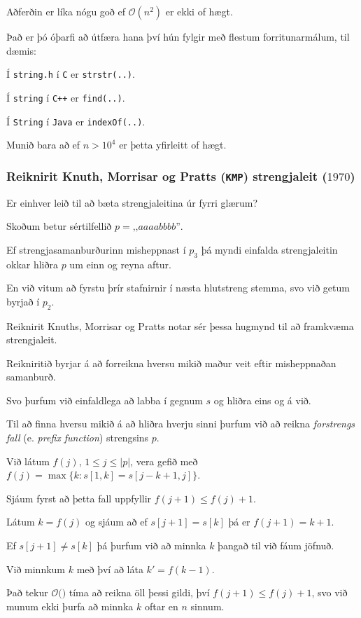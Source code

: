 {
	{
		\item<1-> Aðferðin er líka nógu goð ef $\mathcal{O}(n^2)$ er ekki of hægt.
		\item<2-> Það er þó óþarfi að útfæra hana því hún fylgir með flestum forritunarmálum, til dæmis:
		{
			\item<3-> Í \texttt{string.h} í \texttt{C} er \texttt{strstr(..)}.
			\item<4-> Í \texttt{string} í \texttt{C++} er \texttt{find(..)}.
			\item<5-> Í \texttt{String} í \texttt{Java} er \texttt{indexOf(..)}.
		}
		\item<6-> Munið bara að ef $n > 10^4$ er þetta yfirleitt of hægt.
	}
}

{
	\frametitle{Reiknirit Knuth, Morrisar og Pratts (\texttt{KMP}) strengjaleit ($1970$)}
	{
		\item<1-> Er einhver leið til að bæta strengjaleitina úr fyrri glærum?
		\item<2-> Skoðum betur sértilfellið $p = \text{,,}aaaabbbb\text{''}$.
		\item<3-> Ef strengjasamanburðurinn misheppnast í $p_3$ þá myndi einfalda strengjaleitin okkar hliðra $p$ um einn og reyna aftur.
		\item<4-> En við vitum að fyrstu þrír stafnirnir í næsta hlutstreng stemma, svo við getum byrjað í $p_2$.
		\item<5-> Reiknirit Knuths, Morrisar og Pratts notar sér þessa hugmynd til að framkvæma strengjaleit.
		\item<6-> Reikniritið byrjar á að forreikna hversu mikið maður veit eftir misheppnaðan samanburð.
		\item<7-> Svo þurfum við einfaldlega að labba í gegnum $s$ og hliðra eins og á við.
	}
}

{
	{
		\item<1-> Til að finna hversu mikið á að hliðra hverju sinni þurfum við að reikna \emph{forstrengs fall} (e. \emph{prefix function})
					strengsins $p$.
		\item<2-> Við látum $f(j)$, $1 \leq j \leq |p|$, vera gefið með $f(j) = \max\{k \colon s[1,k] = s[j - k + 1, j]\}$.
		\item<3-> Sjáum fyrst að þetta fall uppfyllir $f(j + 1) \leq f(j) + 1$.
		\item<4-> Látum $k = f(j)$ og sjáum að ef $s[j + 1] = s[k]$ þá er $f(j + 1) = k + 1$.
		\item<5-> Ef $s[j + 1] \neq s[k]$ þá þurfum við að minnka $k$ þangað til við fáum jöfnuð.
		\item<6-> Við minnkum $k$ með því að láta $k' = f(k - 1)$.
		\item<7-> Það tekur $\mathcal{O}($$)$ tíma að reikna öll þessi gildi,
					því $f(j + 1) \leq f(j) + 1$, svo við munum ekki þurfa að minnka $k$ oftar en $n$ sinnum.
	}
}

